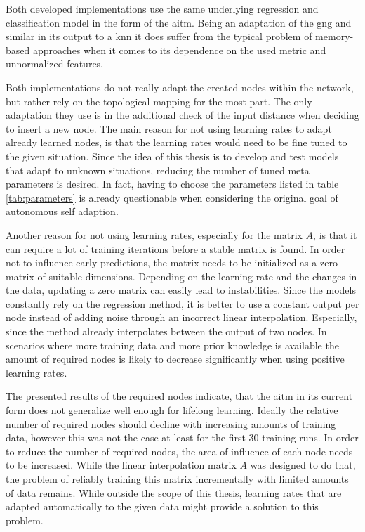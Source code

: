 Both developed implementations use the same underlying regression and classification model in the form of the \gls{aitm}. Being an adaptation of the \gls{gng} and similar in its output to a \gls{knn} it does suffer from the typical problem of memory-based approaches when it comes to its dependence on the used metric and unnormalized features.

Both implementations do not really adapt the created nodes within the network, but rather rely on the topological mapping for the most part. The only adaptation they use is in the additional check of the input distance when deciding to insert a new node. 
The main reason for not using learning rates to adapt already learned nodes, is that the learning rates would need to be fine tuned to the given situation. Since the idea of this thesis is to develop and test models that adapt to unknown situations, reducing the number of tuned meta parameters is desired. In fact, having to choose the parameters listed in table \ref{tab:parameters} is already questionable when considering the original goal of autonomous self adaption.

Another reason for not using learning rates, especially for the matrix $A$, is that it can require a lot of training iterations before a stable matrix is found. In order not to influence early predictions, the matrix needs to be initialized as a zero matrix of suitable dimensions. Depending on the learning rate and the changes in the data, updating a zero matrix can easily lead to instabilities.
Since the models constantly rely on the regression method, it is better to use a constant output per node instead of adding noise through an incorrect linear interpolation. Especially, since the method already interpolates between the output of two nodes.
In scenarios where more training data and more prior knowledge is available the amount of required nodes is likely to decrease significantly when using positive learning rates.

The presented results of the required nodes indicate, that the \gls{aitm} in its current form does not generalize well enough for lifelong learning. Ideally the relative number of required nodes should decline with increasing amounts of training data, however this was not the case at least for the first 30 training runs. In order to reduce the number of required nodes, the area of influence of each node needs to be increased. While the linear interpolation matrix $A$ was designed to do that, the problem of reliably training this matrix incrementally with limited amounts of data remains. While outside the scope of this thesis, learning rates that are adapted automatically to the given data might provide a solution to this problem.

